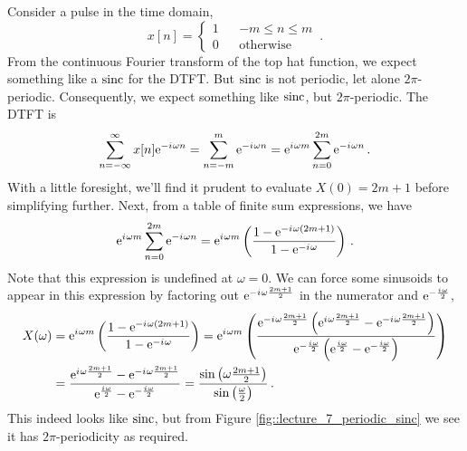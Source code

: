 \begin{exmp}
  Consider a pulse in the time domain,
  \begin{displaymath}
    x[n] = \left\{\begin{array}{ccl}
    1 & & -m \leq n \leq m \\
    0 & & \mathrm{otherwise}
    \end{array}\right. \,.
  \end{displaymath}
  From the continuous Fourier transform of the top hat function, we expect
  something like a $\operatorname{sinc}$ for the DTFT. But $\operatorname{sinc}$ is not periodic, let alone
  $2\pi$-periodic. Consequently, we expect something like $\operatorname{sinc}$, but $2\pi$-periodic.
  The DTFT is
  \begin{displaymath}
    \sum_{n=-\infty}^\infty x[n]\mathrm{e}^{-{i\mkern1mu}\omega n} = \sum_{n=-m}^m \mathrm{e}^{-{i\mkern1mu}\omega n}
    = \mathrm{e}^{{i\mkern1mu}\omega m}\sum_{n=0}^{2m}\mathrm{e}^{-{i\mkern1mu}\omega n} \,.
  \end{displaymath}
  With a little foresight, we'll find it prudent to evaluate
  $X(0) = 2m + 1$ before simplifying further. Next, from a table of finite sum
  expressions, we have
  \begin{displaymath}
    \mathrm{e}^{{i\mkern1mu}\omega m}\sum_{n=0}^{2m}\mathrm{e}^{-{i\mkern1mu}\omega n}
    = \mathrm{e}^{{i\mkern1mu}\omega m}\left(
    \frac{1 - \mathrm{e}^{-{i\mkern1mu}\omega(2m+1)}}{1 - \mathrm{e}^{-{i\mkern1mu}\omega}}
    \right) \,.
  \end{displaymath}
  Note that this expression is undefined at $\omega = 0$. We can force some
  sinusoids to appear in this expression by factoring out $\mathrm{e}^{-{i\mkern1mu}\omega\frac{2m+1}{2}}$
  in the numerator and $\mathrm{e}^{-\frac{{i\mkern1mu}\omega}{2}}$,
  \begin{align*}
    X(\omega) &= \mathrm{e}^{{i\mkern1mu}\omega m}\left(
    \frac{1 - \mathrm{e}^{-{i\mkern1mu}\omega(2m+1)}}{1 - \mathrm{e}^{-{i\mkern1mu}\omega}}
    \right)
    = \mathrm{e}^{{i\mkern1mu}\omega m}\left(
    \frac{\mathrm{e}^{-{i\mkern1mu}\omega\frac{2m+1}{2}}\left(\mathrm{e}^{{i\mkern1mu}\omega\frac{2m+1}{2}}
        - \mathrm{e}^{-{i\mkern1mu}\omega\frac{2m+1}{2}}\right)}{\mathrm{e}^{-\frac{{i\mkern1mu}\omega}{2}}\left(\mathrm{e}^{\frac{{i\mkern1mu}\omega}{2}}
      - \mathrm{e}^{-\frac{{i\mkern1mu}\omega}{2}}\right)}
    \right) \\
    &= 
    \frac{
      \mathrm{e}^{{i\mkern1mu}\omega\frac{2m+1}{2}} - \mathrm{e}^{-{i\mkern1mu}\omega\frac{2m+1}{2}}
    }{
      \mathrm{e}^{\frac{{i\mkern1mu}\omega}{2}} - \mathrm{e}^{-\frac{{i\mkern1mu}\omega}{2}}
    } 
    = \frac{\sin\left(\omega\frac{2m+1}{2}\right)}{\sin\left(\frac{\omega}{2}\right)} \,.
  \end{align*}
  This indeed looks like $\operatorname{sinc}$, but from Figure \ref{fig::lecture_7_periodic_sinc}
  we see it has $2\pi$-periodicity as required.
\end{exmp}
